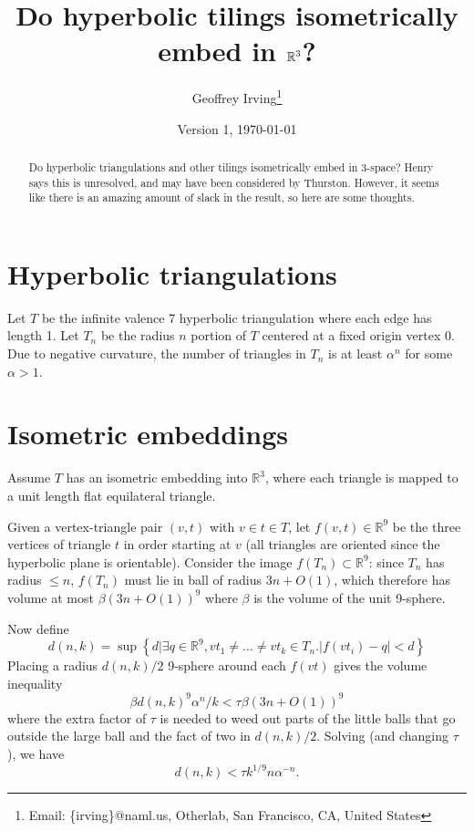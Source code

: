 \documentclass[11pt]{article}
\title{Do hyperbolic tilings isometrically embed in $\R^3$?}
\author{Geoffrey Irving\thanks{Email: \{irving\}@naml.us, Otherlab, San Francisco, CA, United States}}
\date{Version 1, \today}
\newcommand{\R}{\mathbb{R}}
\begin{document}
\maketitle

\begin{abstract}
Do hyperbolic triangulations and other tilings isometrically embed in 3-space?
Henry says this is unresolved, and may have been considered by Thurston.
However, it seems like there is an amazing amount of slack in the result, so
here are some thoughts.
\end{abstract}

\section{Hyperbolic triangulations}

Let $T$ be the infinite valence 7 hyperbolic triangulation where each edge has length 1.
Let $T_n$ be the radius $n$ portion of $T$ centered at a fixed origin vertex $0$.  Due to negative
curvature, the number of triangles in $T_n$ is at least $\alpha^n$ for some $\alpha > 1$.

\section{Isometric embeddings}

Assume $T$ has an isometric embedding into $\R^3$, where each triangle is mapped to a unit length flat
equilateral triangle.

Given a vertex-triangle pair $(v,t)$ with $v \in t \in T$, let $f(v,t) \in \R^9$ be the three vertices
of triangle $t$ in order starting at $v$ (all triangles are oriented since the hyperbolic plane is
orientable).  Consider the image $f(T_n) \subset \R^9$: since $T_n$ has radius $\le n$, $f(T_n)$ must
lie in ball of radius $3n+O(1)$, which therefore has volume at most $\beta (3n+O(1))^9$ where $\beta$
is the volume of the unit 9-sphere.

Now define
$$d(n,k) = \sup \left\{ d | \exists q \in \R^9, vt_1 \ne \ldots \ne vt_k \in T_n . \left|f(vt_i) - q\right| < d \right\}$$
Placing a radius $d(n,k)/2$ 9-sphere around each $f(vt)$ gives the volume inequality
$$\beta d(n,k)^9 \alpha^n / k < \tau \beta (3n+O(1))^9$$
where the extra factor of $\tau$ is needed to weed out parts of the little balls that go outside
the large ball and the fact of two in $d(n,k)/2$.  Solving (and changing $\tau$), we have
$$d(n,k) < \tau k^{1/9} n \alpha^{-n}.$$
\end{document}
